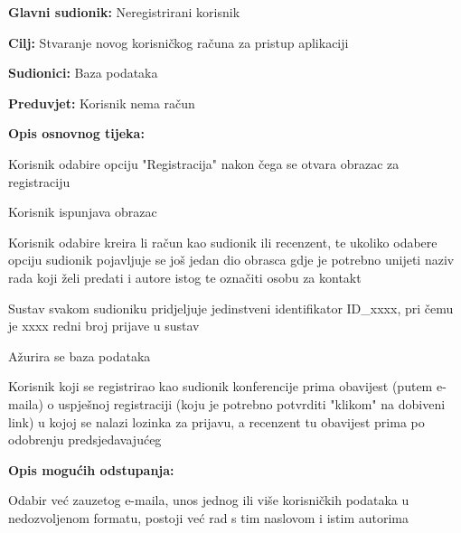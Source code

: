 					\noindent {}
					\begin{packed_item}
	
						\item \textbf{Glavni sudionik: } Neregistrirani korisnik
						\item  \textbf{Cilj:} Stvaranje novog korisničkog računa za pristup aplikaciji
						\item  \textbf{Sudionici:} Baza podataka
						\item  \textbf{Preduvjet:} Korisnik nema račun
						\item  \textbf{Opis osnovnog tijeka:}
						
						\item[] \begin{packed_enum}
	
							\item Korisnik odabire opciju "Registracija" nakon čega se otvara obrazac za registraciju
							\item Korisnik ispunjava obrazac
							\item Korisnik odabire kreira li račun kao sudionik ili recenzent, te ukoliko odabere opciju sudionik pojavljuje se još jedan dio obrasca gdje je potrebno unijeti naziv rada koji želi predati i autore istog te označiti osobu za kontakt
							\item Sustav svakom sudioniku pridjeljuje jedinstveni identifikator ID\_xxxx, pri čemu je xxxx redni broj prijave u sustav
							\item Ažurira se baza podataka
							\item Korisnik koji se registrirao kao sudionik konferencije prima obavijest (putem e-maila) o uspješnoj registraciji (koju je potrebno potvrditi "klikom" na dobiveni link) u kojoj se nalazi lozinka za prijavu, a recenzent tu obavijest prima po odobrenju predsjedavajućeg
							
						\end{packed_enum}

						\item  \textbf{Opis mogućih odstupanja:}
						
						\item[] \begin{packed_item}
	
							\item[2.a]  Odabir već zauzetog e-maila, unos jednog ili više korisničkih podataka u nedozvoljenom formatu, postoji već rad s tim naslovom i istim autorima
							\item[] \begin{packed_enum}
								

\end{packed_enum}
\end{packed_item}
\end{packed_item}
